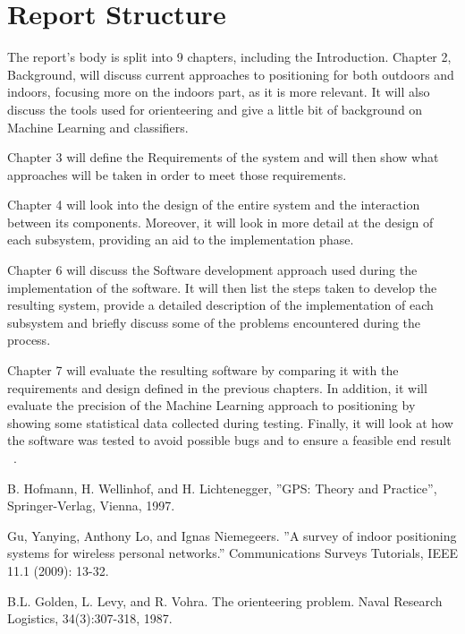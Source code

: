 \documentclass[12pt]{informatics-report}
\begin{document}
\section{Report Structure}
The report's body is split into 9 chapters, including the Introduction.
Chapter 2, Background, will discuss current approaches to positioning for both outdoors and indoors, focusing more on the indoors part, as it is more relevant. It will also discuss the tools used for orienteering and give a little bit of background on Machine Learning and classifiers. 

Chapter 3 will define the Requirements of the system and will then show what approaches will be taken in order to meet those requirements.

Chapter 4 will look into the design of the entire system and the interaction between its components. Moreover, it will look in more detail at the design of each subsystem, providing an aid to the implementation phase.

Chapter 6 will discuss the Software development approach used during the implementation of the software. It will then list the steps taken to develop the resulting system, provide a detailed description of the implementation of each subsystem and briefly discuss some of the problems encountered during the process.

Chapter 7 will evaluate the resulting software by comparing it with the requirements and design defined in the previous chapters. In addition, it will evaluate the precision of the Machine Learning approach to positioning by showing some statistical data collected during testing. Finally, it will look at how the software was tested to avoid possible bugs and to ensure a feasible end result ~\cite{Hofmann}.
 














\begin{thebibliography}{99}

 B. Hofmann, H. Wellinhof, and H. Lichtenegger, ”GPS: Theory and Practice”, Springer-Verlag, Vienna, 1997.

 Gu, Yanying, Anthony Lo, and Ignas Niemegeers. ”A survey of indoor positioning systems for wireless personal networks.” Communications Surveys Tutorials, IEEE 11.1 (2009):
13-32.

 B.L. Golden, L. Levy, and R. Vohra. The orienteering problem. Naval Research Logistics, 34(3):307-318, 1987.

\end{thebibliography}

\appendix



\end{document}
